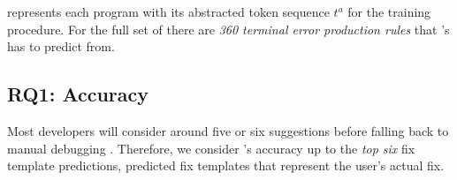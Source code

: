 %
\toolname represents each program with its abstracted token sequence $t^a$ for
the training procedure. For the full set of \python there are \emph{360 terminal
error production rules} that \toolname's has to predict from.



\subsection{RQ1: Accuracy}

\label{sec:eval:accuracy}

Most developers will consider around five or six suggestions before falling back
to manual debugging \citep{Kochhar2016-oc,Parnin2011-ce}.
%
Therefore, we consider \toolname's accuracy up to the \emph{top six} fix
template predictions, \ie predicted fix templates that represent the user's
actual fix.

